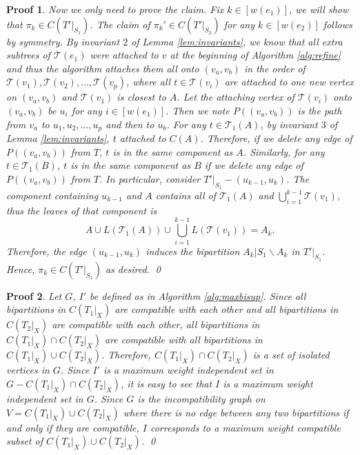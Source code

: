 \documentclass[twocolumn]{bmcart}%
\theoremstyle{mystyle}
\theoremstyle{proofstyle}
\newtheorem*{proof2}{Proof}
\newenvironment{proofnospace}{\begin{proof2}}{\qed \end{proof2}}
\begin{document}
\begin{proofnospace}
    Now we only need to prove the claim. Fix $k \in [w(e_1)]$, we will show that $\pi_k \in C(T'|_{S_1})$. The claim of $\pi_k' \in C(T'|_{S_2})$ for any $k \in [w(e_2)]$ follows by symmetry.  By invariant $2$ of Lemma \ref{lem:invariants}, we know that all extra subtrees of $\mathcal{T}(e_1)$ were attached to $v$ at the beginning of Algorithm \ref{alg:refine} and thus the algorithm attaches them all onto $(v_a, v_b)$ in the order of $\mathcal{T}(v_1),\mathcal{T}(v_2),\dots,\mathcal{T}(v_p)$, where all $t \in \mathcal{T}(v_i)$ are attached to one new vertex on $(v_a,v_b)$ and $\mathcal{T}(v_1)$ is closest to $A$. Let the attaching vertex of $\mathcal{T}(v_i)$ onto $(v_a, v_b)$ be $u_i$ for any $i \in [w(e_1)]$. Then we note $P( (v_a,v_b) )$ is the path from $v_a$ to $u_1,u_2,\dots, u_p$ and then to $u_b$. For any $t \in \mathcal{T}_1(A)$, by invariant $3$ of Lemma \ref{lem:invariants}, $t$ attached to $C(A)$. Therefore, if we delete any edge of $P((v_a,v_b))$ from $T$, $t$ is in the same component as $A$. Similarly, for any $t \in \mathcal{T}_1(B)$, $t$ is in the same component as $B$ if we delete any edge of $P((v_a,v_b))$ from $T$. In particular, consider $T'|_{S_1} - (u_{k-1}, u_k)$. The component containing $u_{k-1}$ and $A$ contains all of $\mathcal{T}_1(A)$ and $\bigcup_{i = 1}^{k-1}\mathcal{T}(v_1)$, thus the leaves of that component is \[A \cup L(\mathcal{T}_1(A)) \cup  \bigcup_{i = 1}^{k-1}L(\mathcal{T}(v_1)) = A_k.\] Therefore, the edge $(u_{k-1},u_k)$ induces the bipartition $A_k | S_1 \backslash A_k$ in $T'|_{S_1}$. Hence, $\pi_k \in C(T'|_{S_1})$ as desired. 
\end{proofnospace}

\claimMaxCompatibleSubset*
\begin{proofnospace}
    Let $G$, $I'$ be defined as in Algorithm \ref{alg:maxbisup}. Since all bipartitions in $C(T_1|_X)$ are compatible with each other and all bipartitions in $C(T_2|_X)$ are compatible with each other, all bipartitions in $C(T_1|_X) \cap C(T_2|_X)$ are compatible with all bipartitions in $C(T_1|_X) \cup C(T_2|_X)$. Therefore, $C(T_1|_X) \cap C(T_2|_X)$ is a set of isolated vertices in $G$. Since $I'$ is a maximum weight independent set in $G - C(T_1|_X) \cap C(T_2|_X)$, it is easy to see that $I$ is a maximum weight independent set in $G$. Since $G$ is the incompatibility graph on $V = C(T_1|_X) \cup C(T_2|_X)$ where there is no edge between any two bipartitions if and only if they are compatible, $I$ corresponds to a maximum weight compatible subset of $C(T_1|_X) \cup C(T_2|_X)$.
\end{proofnospace}
\end{document}
